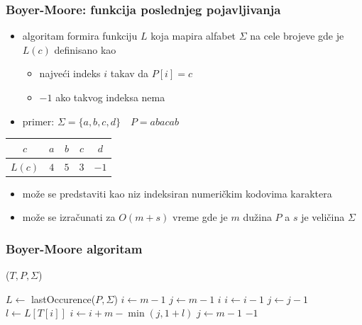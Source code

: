 \documentclass[compress]{beamer}
\begin{document}
\begin{frame}[fragile]
  \frametitle{Boyer-Moore: funkcija poslednjeg pojavljivanja}
  \begin{itemize}
    \item {} algoritam formira  funkciju $L$ koja
    mapira alfabet $\Sigma$ na cele brojeve gde je $L(c)$ definisano kao
    \begin{itemize}
      \item najveći indeks $i$ takav da $P[i]=c$
      \item $-1$ ako takvog indeksa nema
    \end{itemize}
    \item primer: $\Sigma = \{a,b,c,d\} \quad P = abacab$
  \end{itemize}
  \begin{center}
    \begin{tabular}{c||c|c|c|c}
    $c$ & $a$ & $b$ & $c$ & $d$ \\ \hline
    $L(c)$ & $4$ & $5$ & $3$ & $-1$ \\
    \end{tabular}
  \end{center}
  \begin{itemize}
    \item može se predstaviti kao niz indeksiran numeričkim kodovima karaktera
    \item može se izračunati za $O(m+s)$ vreme gde je $m$ dužina $P$ a $s$ je veličina $\Sigma$
  \end{itemize}
\end{frame}

\begin{frame}
  \frametitle{Boyer-Moore algoritam}
  ($T, P, \Sigma$)
  \begin{algorithmic}
    \STATE $L \leftarrow$ lastOccurence($P,\Sigma$)
    \STATE $i \leftarrow m-1$ 
    \STATE $j \leftarrow m-1$ 
    \REPEAT
          \RETURN $i$ 
        \ELSE
          \STATE $i \leftarrow i-1$
          \STATE $j \leftarrow j-1$
        \ENDIF
      \ELSE
        \STATE $l \leftarrow L[T[i]]$ 
        \STATE $i \leftarrow i + m - \min(j, 1+l)$ 
        \STATE $j \leftarrow m-1$
      \ENDIF
    \RETURN $-1$ 
  \end{algorithmic}    
\end{frame}
\end{document}
